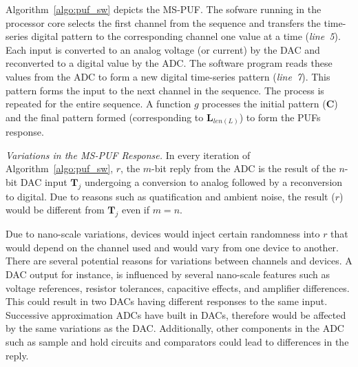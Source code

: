 Algorithm~\ref{algo:puf_sw} depicts the MS-PUF. 
The sofware running in the processor core 
selects the first channel from the sequence and 
transfers the time-series digital pattern to the corresponding
channel one value at a time ({\em line~5}). Each input is converted to an analog voltage (or
current) by the DAC and reconverted to a  digital value by the ADC.
The software program reads these values from the ADC to form a new digital time-series 
pattern ({\em line~7}). This pattern forms the input to the next channel in the sequence. The process
is repeated for the entire sequence. A function $g$ processes the initial pattern ($\mathbf C$) and 
the final pattern formed (corresponding to $\mathbf L_{len(L)}$) to form the PUFs response.

\begin{algorithm}[!ht] \label{algo:puf_sw}
\begin{scriptsize}
	\caption{\emph{MS-PUF : Obtaining the Response to a Challenge}}
	\DontPrintSemicolon
 	\LinesNumbered
\end{scriptsize}
\end{algorithm}

{\flushleft \em Variations in the MS-PUF Response.}
In every iteration of Algorithm~\ref{algo:puf_sw}, $r$, the $m$-bit 
reply from the ADC is the result of the $n$-bit DAC input $\mathbf T_j$ 
undergoing a conversion to analog followed by a reconversion to digital. 
Due to reasons such as quatification and ambient noise, the result ($r$)
would be different from $\mathbf T_j$ even if $m = n$.

Due to nano-scale variations, devices would inject certain randomness into
$r$ that would depend on the channel used and would vary from one device to another. 
There are several potential reasons for variations between channels and devices.
A DAC output for instance, is influenced by several nano-scale features such 
as voltage references, resistor tolerances, 
capacitive effects, and amplifier differences. This could result 
in two DACs having different responses to the same input. 
Successive approximation ADCs have built in DACs, therefore
would be affected by the same variations as the DAC. Additionally,
other components in the ADC such as sample and hold circuits and
comparators could lead to differences in the reply.


